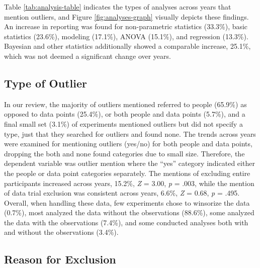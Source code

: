 \documentclass[english,,man]{apa6}
\theoremstyle{definition}
\theoremstyle{definition}
\theoremstyle{definition}
\theoremstyle{remark}
\begin{document}
Table \ref{tab:analysis-table} indicates the types of analyses across
years that mention outliers, and Figure \ref{fig:analyses-graph}
visually depicts these findings. An increase in reporting was found for
non-parametric statistics (33.3\%), basic statistics (23.6\%), modeling
(17.1\%), ANOVA (15.1\%), and regression (13.3\%). Bayesian and other
statistics additionally showed a comparable increase, 25.1\%, which was
not deemed a significant change over years.

\subsection{Type of Outlier}\label{type-of-outlier}

In our review, the majority of outliers mentioned referred to people
(65.9\%) as opposed to data points (25.4\%), or both people and data
points (5.7\%), and a final small set (3.1\%) of experiments mentioned
outliers but did not specify a type, just that they searched for
outliers and found none. The trends across years were examined for
mentioning outliers (yes/no) for both people and data points, dropping
the both and none found categories due to small size. Therefore, the
dependent variable was outlier mention where the \enquote{yes} category
indicated either the people or data point categories separately. The
mentions of excluding entire participants increased across years,
15.2\%, \emph{Z} = 3.00, \emph{p} = .003, while the mention of data
trial exclusion was consistent across years, 6.6\%, \emph{Z} = 0.68,
\emph{p} = .495. Overall, when handling these data, few experiments
chose to winsorize the data (0.7\%), most analyzed the data without the
observations (88.6\%), some analyzed the data with the observations
(7.4\%), and some conducted analyses both with and without the
observations (3.4\%).

\subsection{Reason for Exclusion}\label{reason-for-exclusion}
\end{document}
